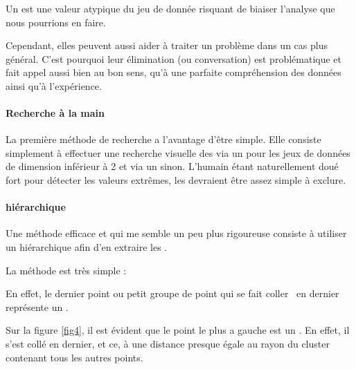 \subsubsection{}
Un  est une valeur atypique du jeu de donnée risquant de biaiser l'analyse que nous pourrions en faire. 

Cependant, elles peuvent aussi aider à traiter un problème dans un cas plus général. C'est pourquoi leur élimination (ou conversation) est problématique et fait appel aussi bien au bon sens, qu'à une parfaite compréhension des données ainsi qu'à l'expérience.

\paragraph{Recherche \og à la main\fg}
La première méthode de recherche a l'avantage d'être simple. Elle consiste simplement à effectuer une recherche visuelle des  via un  pour les jeux de données de dimension inférieur à 2 et via un  sinon. L'humain étant naturellement doué fort pour détecter les valeurs extrêmes, les  devraient être assez simple à exclure. 

\begin{multicols}{2}
	 \columnbreak
\end{multicols}

\paragraph{ hiérarchique}
Une méthode efficace et qui me semble un peu plus rigoureuse consiste à utiliser un  hiérarchique afin d'en extraire les .

La méthode est très simple :  

En effet, le dernier point ou petit groupe de point qui se fait \og coller\fg~ en dernier représente un .

Sur la figure \ref{fig4}, il est évident que le point le plus a gauche est un . En effet, il s'est collé en dernier, et ce, à une distance presque égale au rayon du cluster contenant tous les autres points.

